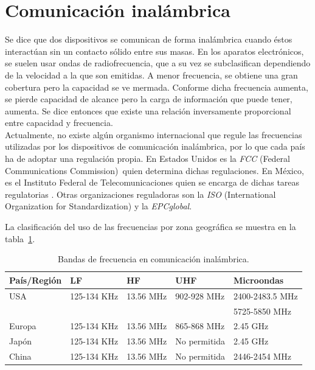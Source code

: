\section{Comunicación inalámbrica}

Se dice que dos dispositivos se comunican de forma inalámbrica cuando éstos interactúan sin un contacto sólido entre sus masas. En los aparatos electrónicos, se suelen usar ondas de radiofrecuencia, que a su vez se subclasifican dependiendo de la velocidad a la que son emitidas. A menor frecuencia, se obtiene una gran cobertura pero la capacidad se ve mermada. Conforme dicha frecuencia aumenta, se pierde capacidad de alcance pero la carga de información que puede tener, aumenta. Se dice entonces que existe una relación inversamente proporcional entre capacidad y frecuencia.\\

Actualmente, no existe algún organismo internacional que regule las frecuencias utilizadas por los dispositivos de comunicación inalámbrica, por lo que cada país ha de adoptar una regulación propia. En Estados Unidos es la \textit{FCC} (Federal Communications Commission\footnotemark)~quien determina dichas regulaciones. En México, es el Instituto Federal de Telecomunicaciones quien se encarga de dichas tareas regulatorias \citep{porinstituto}. Otras organizaciones reguladoras son la \textit{ISO} (International Organization for Standardization\footnotemark) y la \textit{EPCglobal}.


La clasificación del uso de las frecuencias por zona geográfica se muestra en la tabla~\ref{Tab:BandasFreq}.

\begin{table}[H]
\begin{center}
\caption{Bandas de frecuencia en comunicación inalámbrica.}
\label{Tab:BandasFreq}
\begin{tabular}{|l|l|l|l|l|}
	\hline
	\textbf{País/Región} & \textbf{LF} & \textbf{HF} & \textbf{UHF} & \textbf{Microondas}\\
	\hline
	USA & 125-134 KHz & 13.56 MHz & 902-928 MHz & 2400-2483.5 MHz\\& & & & 5725-5850 MHz \\
	\hline
	Europa & 125-134 KHz & 13.56 MHz & 865-868 MHz & 2.45 GHz \\
	\hline
	Japón & 125-134 KHz & 13.56 MHz & No permitida & 2.45 GHz \\
	\hline
	China & 125-134 KHz & 13.56 MHz & No permitida & 2446-2454 MHz \\
	\hline
\end{tabular}
\end{center}
\end{table}

